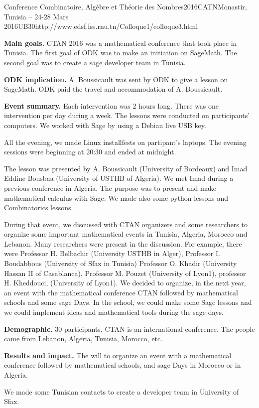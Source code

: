 \begin{event}{Conference Combinatoire, Algèbre et Théorie des Nombres}{2016CATN}{Monastir, Tunisia -- 24-28 Mars 2016}{UB}{30}{http://www.edsf.fss.rnu.tn/Colloque1/colloque3.html}

\textbf{Main goals.}
CTAN 2016 was a mathematical conference that took place in Tunisia.
The first goal of ODK was to make an initiation on SageMath. 
The second goal was to create a sage developer team in Tunisia.

\textbf{ODK implication.} A. Boussicault was sent by ODK to give a lesson on
SageMath. ODK paid the travel and accommodation of A. Boussicault.

\textbf{Event summary.}
Each intervention was 2 hours long. There was one intervention per day during 
a week. 
The lessons were conducted on participants' computers.
We worked with Sage by using a Debian live USB key.

All the evening, we made Linux installfests on partipant's laptops. 
The evening sessions were beginning at 20:30 and ended at midnight.

The lesson was presented by A. Boussicault (University of Bordeaux) and 
Imad Eddine Bousbaa (University of USTHB of Algeria). We met Imad during a 
previous conference in Algeria.
The purpose was to present and make mathematical calculus with Sage.
We made also some python lessons and Combinatorics lessons.

During that event, we discussed with CTAN organizers and some researchers 
to organize some important mathematical events in Tunisia, Algeria, Morocco and
Lebanon.
Many researchers were present in the discussion. For example, there were 
Professor H. Belbachir (University USTHB in Alger), 
Professor I. Boudabbous (University of Sfax in Tunisia)
Professor O. Khadir (University Hassan II of Casablanca),
Professor M. Pouzet (University of Lyon1),
professor H. Kheddouci, (University of Lyon1).
We decided to organize, in the next year, an event with the mathematical 
conference CTAN followed by mathematical schools and some sage Days.
In the school, we could make some Sage lessons and we could implement ideas 
and mathematical tools during the sage days.

\textbf{Demographic.} 30 participants. CTAN is an international conference. 
The people came from Lebanon, Algeria, Tunisia, Morocco, etc. 

\textbf{Results and impact.}
The will to organize an event with a mathematical conference 
followed by mathematical schools, and sage Days in Morocco or in Algeria.

We made some Tunisian contacts to create a developer team in University of 
Sfax.

\end{event}
